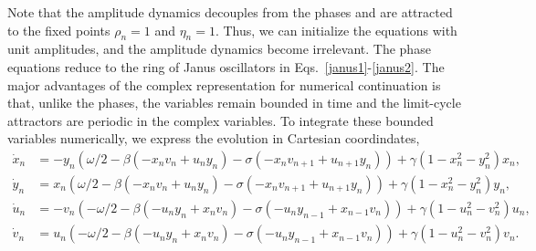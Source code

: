\documentclass[aps,pre,amsmath,amssymb,floatfix,onecolumn,notitlepage,10pt]{revtex4-1}
\begin{document}
Note that the amplitude dynamics decouples from the phases and are attracted to the fixed points $\rho_n=1$ and $\eta_n=1$.  Thus, we can initialize the equations with unit amplitudes, and the amplitude dynamics become irrelevant.  The phase equations reduce to the ring of Janus oscillators in Eqs.~\eqref{janus1}-\eqref{janus2}. The major advantages of the complex representation for numerical continuation is that, unlike the phases, the variables remain bounded in time and the limit-cycle attractors are periodic in the complex variables.  To integrate these bounded variables numerically, we express the evolution in Cartesian coordindates,
\begin{align}
\dot x_n &= -y_n\left(\omega/2 - \beta \left(-x_nv_n+u_ny_n \right) - \sigma\left(-x_nv_{n+1}+u_{n+1}y_n\right) \right) + \gamma\left(1-x_n^2-y_n^2\right)x_n, \\
\dot y_n &= x_n\left(\omega/2 - \beta \left(-x_nv_n+u_ny_n \right) - \sigma\left(-x_nv_{n+1}+u_{n+1}y_n\right) \right) + \gamma\left(1-x_n^2-y_n^2\right)y_n, \\
\dot u_n &= -v_n\left(-\omega/2 - \beta \left(-u_ny_n+x_nv_n \right) - \sigma\left(-u_ny_{n-1}+x_{n-1}v_n\right) \right) + \gamma\left(1-u_n^2-v_n^2\right)u_n, \\
\dot v_n &= u_n\left(-\omega/2 - \beta \left(-u_ny_n+x_nv_n \right) - \sigma\left(-u_ny_{n-1}+x_{n-1}v_n\right) \right) + \gamma\left(1-u_n^2-v_n^2\right)v_n.
\end{align}
\end{document}
